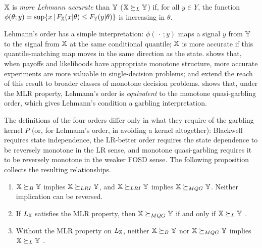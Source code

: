\begin{definition}\label{def:Lehmann}
\citep{lehmann1988comparing, kim2023comparing} ${\mathbb{X}}$ is \emph{more
Lehmann accurate} than ${\mathbb{Y}}$ (${\mathbb{X}} \succeq_{L} {\mathbb{Y}}$) if, for all $y \in Y$,
the function
$\phi(\theta; y) = \sup\{x \,|\, F_{\mathbb{X}}(x|\theta) \leq
F_{\mathbb{Y}}(y|\theta)\}$ is increasing in $\theta$.
\end{definition}

Lehmann's order has a simple interpretation: $\phi(\,\cdot\,; y)$ maps
a signal $y$ from ${\mathbb{Y}}$ to the signal from ${\mathbb{X}}$ at the same
conditional quantile; ${\mathbb{X}}$ is more accurate if this
quantile-matching map moves in the same direction as the state.
\citet{lehmann1988comparing} shows that, when payoffs and likelihoods
have appropriate monotone structure, more accurate experiments are
more valuable in single-decision problems; \citet{persico2000information}
and \citet{quah2009comparative} extend the reach of this result to
broader classes of monotone decision problems.
\citet{kim2023comparing} shows that, under the MLR property, Lehmann's
order is \emph{equivalent} to the monotone quasi-garbling order, which
gives Lehmann's condition a garbling interpretation.

The definitions of the four orders differ only in what they require of
the garbling kernel $P$ (or, for Lehmann's order, in avoiding a kernel
altogether): Blackwell requires state independence, the LR-better
order requires the state dependence to be reversely monotone in the LR
sense, and monotone quasi-garbling requires it to be reversely
monotone in the weaker FOSD sense. The following proposition collects
the resulting relationships.

\begin{proposition}\label{prop:orders}\quad
\begin{enumerate}
\item ${\mathbb{X}} \succeq_{B} {\mathbb{Y}}$ implies ${\mathbb{X}} \succeq_{LRI} {\mathbb{Y}}$, and ${\mathbb{X}} \succeq_{LRI} {\mathbb{Y}}$ implies
  ${\mathbb{X}} \succeq_{MQG} {\mathbb{Y}}$. Neither implication can be reversed.
\item If $L_{\mathbb{X}}$ satisfies the MLR property, then ${\mathbb{X}} \succeq_{MQG} {\mathbb{Y}}$ if
  and only if ${\mathbb{X}} \succeq_{L} {\mathbb{Y}}$ \citep[Theorem~1]{kim2023comparing}.
\item Without the MLR property on $L_{\mathbb{X}}$, neither ${\mathbb{X}} \succeq_{B} {\mathbb{Y}}$ nor
  ${\mathbb{X}} \succeq_{MQG} {\mathbb{Y}}$ implies ${\mathbb{X}} \succeq_{L} {\mathbb{Y}}$
  \citep[Proposition~4]{kim2023comparing}.
\end{enumerate}
\end{proposition}

